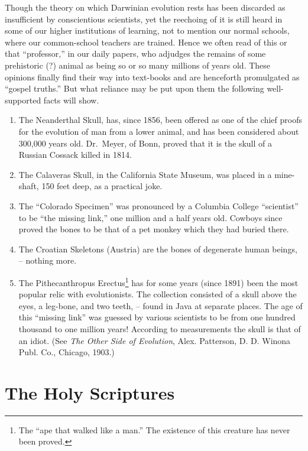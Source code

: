\documentclass[
]{book}
\begin{document}
Though the theory on which Darwinian evolution rests has been discarded as insufficient by conscientious scientists, yet the reechoing of it is still heard in some of our higher institutions of learning, not to mention our normal schools, where our common-school teachers are trained. Hence we often read of this or that ``professor,'' in our daily papers, who adjudges the remains of some prehistoric (?) animal as being so or so many millions of years old. These opinions finally find their way into text-books and are henceforth promulgated as ``gospel truths.'' But what reliance may be put upon them the following well-supported facts will show.

\begin{enumerate}
\def\labelenumi{\arabic{enumi}.}
\item
  The Neanderthal Skull, has, since 1856, been offered as one of the chief proofs for the evolution of man from a lower animal, and has been considered about 300,000 years old. Dr.~Meyer, of Bonn, proved that it is the skull of a Russian Cossack killed in 1814.
\item
  The Calaveras Skull, in the California State Museum, was placed in a mine-shaft, 150 feet deep, as a practical joke.
\item
  The ``Colorado Specimen'' was pronounced by a Columbia College ``scientist'' to be ``the missing link,'' one million and a half years old. Cowboys since proved the bones to be that of a pet monkey which they had buried there.
\item
  The Croatian Skeletons (Austria) are the bones of degenerate human beings, -- nothing more.
\item
  The Pithecanthropus Erectus\footnote{The ``ape that walked like a man.'' The existence of this creature has never been proved.} has for some years (since 1891) been the most popular relic with evolutionists. The collection consisted of a skull above the eyes, a leg-bone, and two teeth, -- found in Java at separate places. The age of this ``missing link'' was guessed by various scientists to be from one hundred thousand to one million years! According to measurements the skull is that of an idiot. (See \emph{The Other Side of Evolution}, Alex. Patterson, D. D. Winona Publ. Co., Chicago, 1903.)
\end{enumerate}

\hypertarget{the-holy-scriptures}{%
\section*{\texorpdfstring{The Holy Scriptures}{The Holy Scriptures}}\label{the-holy-scriptures}}
\end{document}
